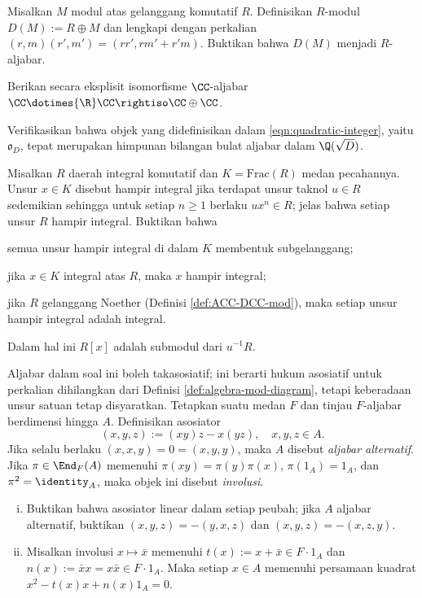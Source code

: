\begin{Exercises}
	\item Misalkan $M$ modul atas gelanggang komutatif $R$. Definisikan $R$-modul $D(M) := R \oplus M$ dan lengkapi dengan perkalian $(r,m) (r', m') = (rr', rm' +r'm)$. Buktikan bahwa $D(M)$ menjadi $R$-aljabar.
	\item Berikan secara eksplisit isomorfisme $\CC$-aljabar $\CC \dotimes{\R} \CC \rightiso \CC \oplus \CC$.
	\item Verifikasikan bahwa objek yang didefinisikan dalam \eqref{eqn:quadratic-integer}, yaitu $\mathfrak{o}_D$, tepat merupakan himpunan bilangan bulat aljabar dalam $\Q(\sqrt{D})$.
	\item Misalkan $R$ daerah integral komutatif dan $K = \text{Frac}(R)$ medan pecahannya. Unsur $x \in K$ disebut hampir integral jika terdapat unsur taknol $u \in R$ sedemikian sehingga untuk setiap $n \geq 1$ berlaku $ux^n \in R$; jelas bahwa setiap unsur $R$ hampir integral. Buktikan bahwa
		\begin{compactitem}
			\item semua unsur hampir integral di dalam $K$ membentuk subgelanggang;
			\item jika $x \in K$ integral atas $R$, maka $x$ hampir integral; 
			\item jika $R$ gelanggang Noether (Definisi \ref{def:ACC-DCC-mod}), maka setiap unsur hampir integral adalah integral. \begin{hint} Dalam hal ini $R[x]$ adalah submodul dari $u^{-1} R$.\end{hint}
		\end{compactitem}
	\item Aljabar dalam soal ini boleh takasosiatif; ini berarti hukum asosiatif untuk perkalian dihilangkan dari Definisi \ref{def:algebra-mod-diagram}, tetapi keberadaan unsur satuan tetap disyaratkan. Tetapkan suatu medan $F$ dan tinjau $F$-aljabar berdimensi hingga $A$. Definisikan asosiator
		\[ (x,y,z) := (xy)z - x(yz), \quad x,y,z \in A. \]
		Jika selalu berlaku $(x,x,y)=0=(x,y,y)$, maka $A$ disebut \emph{aljabar alternatif}. Jika $\pi \in \End_F(A)$ memenuhi $\pi(xy)=\pi(y)\pi(x)$, $\pi(1_A)=1_A$, dan $\pi^2 = \identity_A$, maka objek ini disebut \emph{involusi}.
		\begin{enumerate}[(i)]
			\item Buktikan bahwa asosiator linear dalam setiap peubah; jika $A$ aljabar alternatif, buktikan $(x,y,z) = -(y,x,z)$ dan $(x,y,z) = -(x,z,y)$.
			\item Misalkan involusi $x \mapsto \bar{x}$ memenuhi $t(x) := x+\bar{x} \in F \cdot 1_A$ dan $n(x) := \bar{x}x = x\bar{x} \in F \cdot 1_A$. Maka setiap $x \in A$ memenuhi persamaan kuadrat $x^2 - t(x)x + n(x) 1_A = 0$.

\end{enumerate}
\end{Exercises}
